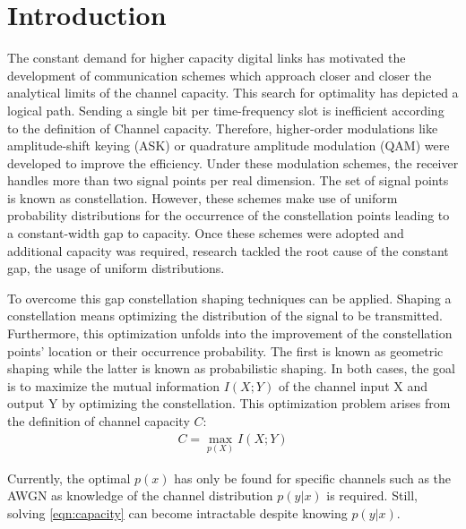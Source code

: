 \chapter{Introduction}\label{chap:introduction}

The constant demand for higher capacity digital links has motivated the development of communication schemes which approach closer and closer the analytical limits of the channel capacity. This search for optimality has depicted a logical path. Sending a single bit per time-frequency slot is inefficient according to the definition of Channel capacity. Therefore, higher-order modulations like amplitude-shift keying (ASK) or quadrature amplitude modulation (QAM) were developed to improve the efficiency. Under these modulation schemes, the receiver handles more than two signal points per real dimension. The set of signal points is known as constellation. However, these schemes make use of uniform probability distributions for the occurrence of the constellation points leading to a constant-width gap to capacity. Once these schemes were adopted and additional capacity was required, research tackled the root cause of the constant gap, the usage of uniform distributions.

To overcome this gap constellation shaping techniques can be applied. Shaping a constellation means optimizing the distribution of the signal to be transmitted. Furthermore, this optimization unfolds into the improvement of the constellation points' location or their occurrence probability. The first is known as geometric shaping while the latter is known as probabilistic shaping. In both cases, the goal is to maximize the mutual information $I(X;Y)$ of the channel  input X and output Y by optimizing the constellation. This optimization problem arises from the definition of channel capacity $C$:
\begin{align}
\label{eqn:capacity}
	C = \max_{p(X)} I(X;Y)
\end{align}

Currently, the optimal $p(x)$ has only be found for specific channels such as the AWGN as knowledge of the channel distribution $p(y|x)$ is required. Still, solving \ref{eqn:capacity} can become intractable despite knowing $p(y|x)$.

